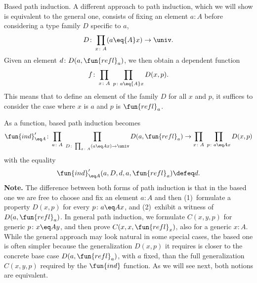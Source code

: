 \begin{lpar}{Based path induction.}\label{lpar:based-path-induction}
    A different approach to path induction, which we will show is equivalent to the general one, consists of fixing an element\/ $a\colon A$ before considering a type family\/ $D$ specific to\/ $a$,
    \[
        D\colon\prod_{x\colon A}(a\eq{A}x)\to\univ.
    \]
    Given an element\/ $d\colon D(a,\fun{refl}_a)$, we then obtain a dependent function
    \[
        f\colon\prod_{x\colon A}\;\prod_{p\colon a\eq{A}x}D(x,p).
    \]
    This means that to define an element of the family $D$ for all $x$ and $p$, it suffices to consider the case where $x$ is $a$ and $p$ is $\fun{refl}_a$.
    
    As a function, based path induction becomes
    \begin{equation}\label{eq:ind'=A}
    \fun{ind}'_{\eq A}\colon\prod_{a\colon A}
        \;\prod_{D\colon\prod_{x\colon A}(a\eq Ax)\to\univ}
        D(a,\fun{refl}_a)
        \to
        \prod_{x\colon A}\;\prod_{p\colon a\eq Ax}D(x,p)
    \end{equation}
    with the equality
    \[
        \fun{ind}'_{\eq A}(a,D,d,a,\fun{refl}_a)\defeq d.
    \]
    \textbf{Note.} The difference between both forms of path induction is that in the based one we are free to choose and fix an element $a\colon A$ and then (1)~formulate a property $D(x,p)$ for every $p\colon a\eq Ax$, and (2)~exhibit a witness of $D(a,\fun{refl}_a)$. In general path induction, we formulate $C(x,y,p)$ for generic $p\colon x\eq Ay$, and then prove $C(x,x,\fun{refl}_x)$, also for a generic $x\colon A$. While the general approach may look natural in some special cases, the based one is often simpler because the generalization $D(x,p)$ it requires is closer to the concrete base case $D(a,\fun{refl}_a)$, with $a$ fixed, than the full generalization $C(x,y,p)$ required by the $\fun{ind}$ function. As we will see next, both notions are equivalent.
\end{lpar}

